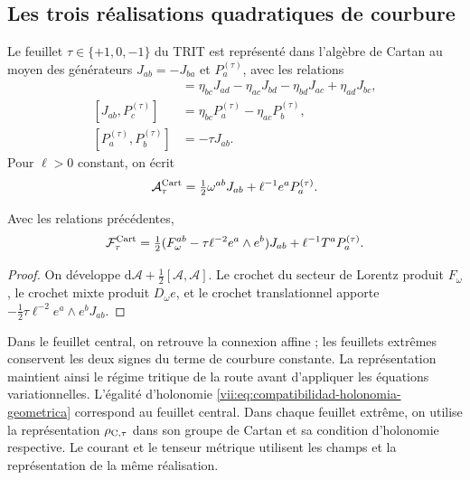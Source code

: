 \subsection{Les trois réalisations quadratiques de courbure}

Le feuillet \(\tau\in\{+1,0,-1\}\) du TRIT est représenté dans
l'algèbre de Cartan au moyen des générateurs \(J_{ab}=-J_{ba}\)
et \(P_a^{(\tau)}\), avec les relations
\begin{align*}
 [J_{ab},J_{cd}]&=
 \eta_{bc}J_{ad}-\eta_{ac}J_{bd}
 -\eta_{bd}J_{ac}+\eta_{ad}J_{bc},\\
 [J_{ab},P_c^{(\tau)}]&=
 \eta_{bc}P_a^{(\tau)}-\eta_{ac}P_b^{(\tau)},\\
 [P_a^{(\tau)},P_b^{(\tau)}]&=-\tau J_{ab}.
\end{align*}
Pour \(\ell>0\) constant, on écrit
\[
 \mathcal A_\tau^{\rm Cart}
 =\tfrac12\omega^{ab}J_{ab}+\ell^{-1}e^aP_a^{(\tau)}.
\]

\begin{proposition}
\label{vii:prop:curvatura-tritificada}
Avec les relations précédentes,
\begin{equation}
 \mathcal F_\tau^{\rm Cart}
 =\tfrac12(F_\omega^{ab}-\tau\ell^{-2}e^a\wedge e^b)J_{ab}
     +\ell^{-1}T^aP_a^{(\tau)}.
 \label{vii:eq:curvatura-tritificada}
\end{equation}
\end{proposition}
\begin{proof}
On développe \(\mathrm d\mathcal A+\tfrac12[\mathcal A,\mathcal A]\). Le crochet du secteur de Lorentz produit \(F_\omega\), le crochet mixte produit \(D_\omega e\), et le crochet translationnel apporte \(-\tfrac12\tau\ell^{-2}e^a\wedge e^bJ_{ab}\).
\end{proof}

Dans le feuillet central, on retrouve la connexion affine ; les feuillets extrêmes
conservent les deux signes du terme de courbure constante. La
représentation maintient ainsi le régime tritique de la route avant
d'appliquer les équations variationnelles. L'égalité d'holonomie
\eqref{vii:eq:compatibilidad-holonomia-geometrica} correspond au
feuillet central. Dans chaque feuillet extrême, on utilise la représentation
\(\rho_{{\rm C},\tau}\) dans son groupe de Cartan et sa condition
d'holonomie respective. Le courant et le tenseur métrique utilisent
les champs et la représentation de la même réalisation.
